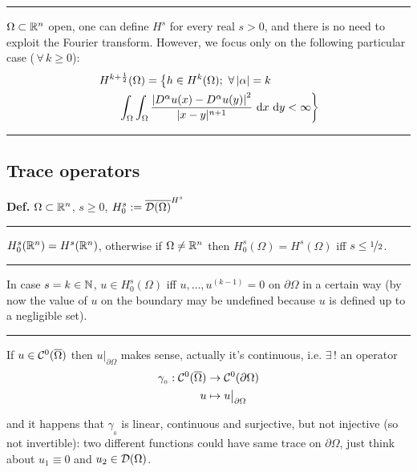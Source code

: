 \rule{0.31\textwidth}{0.2pt}
\smallskip

$\Omega\subset\mathbb{R}^n$ open, one can define $H^s$ for every real $s>0$, and there is no need to exploit the Fourier transform. However, we focus only on the following particular case ($\,\forall\, k\geq 0$):
\begin{gather*}
H^{k+\frac{1}{2}}(\Omega)= \left\{ h\in H^k(\Omega);\ \forall\, |\alpha|=k \right. \qquad\qquad \\
\left. \qquad\int_\Omega \int_\Omega \frac{\left| D^\alpha u(x)-D^\alpha u(y) \right|^2}{|x-y|^{n+1}}\  \mathrm{d} x\  \mathrm{d} y<\infty  \right\}
\end{gather*}

\rule{0.31\textwidth}{0.2pt}

\newpage


\subsection{\texorpdfstring{\color{red}Trace operators}{}}


\textbf{Def.} $\Omega\subset \mathbb{R}^n$, $s\geq 0$, $H_0^s:=\overline{\mathcal{D}(\Omega)}^{H^s}$

\rule{0.31\textwidth}{0.2pt}
\smallskip

$H_0^s(\mathbb{R}^n)=H^s(\mathbb{R}^n)$, otherwise if $\Omega\neq\mathbb{R}^n$ then $H_0^s(\Omega)=H^s(\Omega)$ iff $s\leq\nicefrac{1}{2}$.

\rule{0.31\textwidth}{0.2pt}
\smallskip

In case $s=k\in\mathbb{N}$, $u\in H^s_0(\Omega)$ iff $u,\dots,u^{(k-1)}=0$ on $\partial\Omega$ in a certain way (by now the value of $u$ on the boundary may be undefined because $u$ is defined up to a negligible set).

\rule{0.31\textwidth}{0.2pt}
\smallskip

If $u\in\mathcal{C}^0(\overline{\Omega})$ then $u\big|_{\partial\Omega}$ makes sense, actually it's continuous, i.e. $\exists \,!$ an operator
\begin{align*}
\gamma_{_0}:\mathcal{C}^0(\overline{\Omega})&\to\mathcal{C}^0(\partial\Omega) \\
u&\mapsto u\big|_{\partial\Omega}
\end{align*}

and it happens that $\gamma_{_0}$ is linear, continuous and surjective, but not injective (so not invertible): two different functions could have same trace on $\partial\Omega$, just think about $u_1\equiv0$ and $u_2\in\mathcal{D}(\Omega)$.

